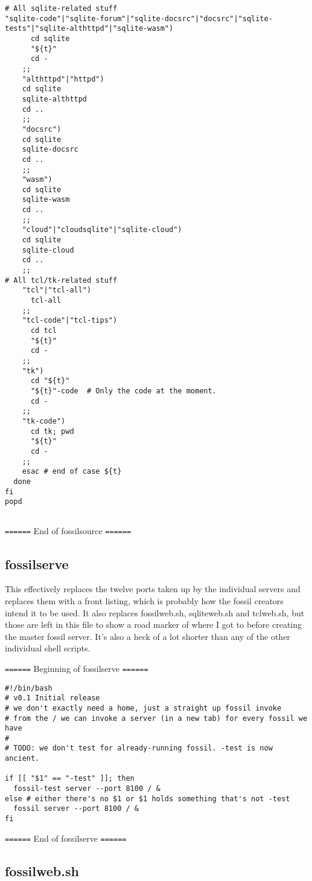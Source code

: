 \documentclass[11pt]{article}
\begin{document}
\begin{verbatim}
# All sqlite-related stuff
"sqlite-code"|"sqlite-forum"|"sqlite-docsrc"|"docsrc"|"sqlite-tests"|"sqlite-althttpd"|"sqlite-wasm") 
      cd sqlite
      "${t}"
      cd -
    ;;
    "althttpd"|"httpd") 
	cd sqlite
	sqlite-althttpd
	cd ..
    ;;
    "docsrc")
	cd sqlite
	sqlite-docsrc
	cd ..
    ;;
    "wasm")
	cd sqlite
	sqlite-wasm
	cd ..
    ;;
    "cloud"|"cloudsqlite"|"sqlite-cloud")
	cd sqlite
	sqlite-cloud
	cd ..
    ;;
# All tcl/tk-related stuff
    "tcl"|"tcl-all")
      tcl-all
    ;;
    "tcl-code"|"tcl-tips")
      cd tcl
      "${t}"
      cd -
    ;;
    "tk")
      cd "${t}"
      "${t}"-code  # Only the code at the moment.
      cd -
    ;;
    "tk-code") 
      cd tk; pwd
      "${t}"
      cd -
    ;;
    esac # end of case ${t}
  done
fi
popd


\end{verbatim}

\texttt{======} End of fossilsource \texttt{======}

\subsection*{fossilserve}
\label{sec:org6e1dfb1}

This effectively replaces the twelve ports taken up by the individual servers and replaces them with
a front listing, which is probably how the fossil creators intend it to be used. It also replaces
fossilweb.sh, sqliteweb.sh and tclweb.sh, but those are left in this file to show a road marker of
where I got to before creating the master fossil server. It's also a heck of a lot shorter than any
of the other individual shell scripts.

\texttt{======} Beginning of fossilserve \texttt{======}

\begin{verbatim}
#!/bin/bash
# v0.1 Initial release
# we don't exactly need a home, just a straight up fossil invoke
# from the / we can invoke a server (in a new tab) for every fossil we have
#
# TODO: we don't test for already-running fossil. -test is now ancient.

if [[ "$1" == "-test" ]]; then
  fossil-test server --port 8100 / &
else # either there's no $1 or $1 holds something that's not -test
  fossil server --port 8100 / &
fi
\end{verbatim}

\texttt{======} End of fossilserve \texttt{======}

\subsection*{fossilweb.sh}
\label{sec:org01a4fdb}
\end{document}
